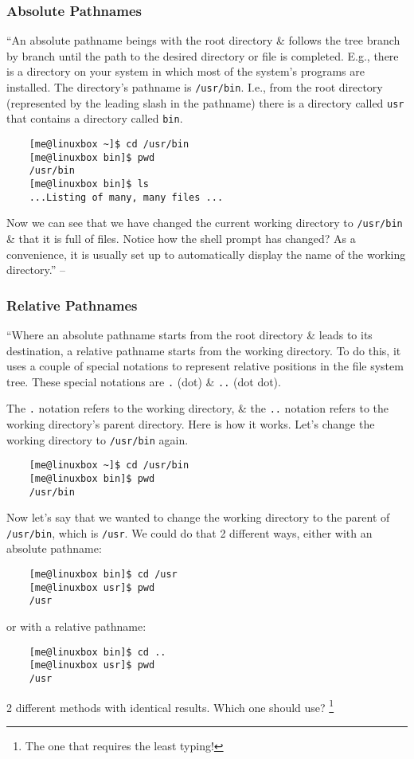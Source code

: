 \documentclass[oneside]{book}
\numberwithin{equation}{section}
\begin{document}
\subsubsection{Absolute Pathnames}
``An absolute pathname beings with the root directory \& follows the tree branch by branch until the path to the desired directory or file is completed. E.g., there is a directory on your system in which most of the system's programs are installed. The directory's pathname is \texttt{/usr/bin}. I.e., from the root directory (represented by the leading slash in the pathname) there is a directory called \texttt{usr} that contains a directory called \texttt{bin}.
\begin{verbatim}
	[me@linuxbox ~]$ cd /usr/bin
	[me@linuxbox bin]$ pwd
	/usr/bin
	[me@linuxbox bin]$ ls
	...Listing of many, many files ...
\end{verbatim}
Now we can see that we have changed the current working directory to \texttt{/usr/bin} \& that it is full of files. Notice how the shell prompt has changed? As a convenience, it is usually set up to automatically display the name of the working directory.'' -- \cite[p. 46]{Shotts2019}

\subsubsection{Relative Pathnames}
``Where an absolute pathname starts from the root directory \& leads to its destination, a relative pathname starts from the working directory. To do this, it uses a couple of special notations to represent relative positions in the file system tree. These special notations are \texttt{.} (dot) \& \texttt{..} (dot dot).

The \texttt{.} notation refers to the working directory, \& the \texttt{..} notation refers to the working directory's parent directory. Here is how it works. Let's change the working directory to \texttt{/usr/bin} again.
\begin{verbatim}
	[me@linuxbox ~]$ cd /usr/bin
	[me@linuxbox bin]$ pwd
	/usr/bin
\end{verbatim}
Now let's say that we wanted to change the working directory to the parent of \texttt{/usr/bin}, which is \texttt{/usr}. We could do that 2 different ways, either with an absolute pathname:
\begin{verbatim}
	[me@linuxbox bin]$ cd /usr
	[me@linuxbox usr]$ pwd
	/usr
\end{verbatim}
or with a relative pathname:
\begin{verbatim}
	[me@linuxbox bin]$ cd ..
	[me@linuxbox usr]$ pwd
	/usr
\end{verbatim}
2 different methods with identical results. Which one should use? \footnote{The one that requires the least typing!}
\end{document}
